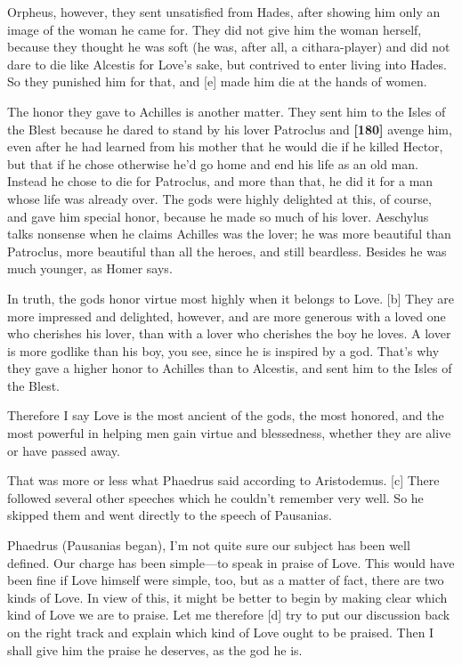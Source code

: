 Orpheus, however, they sent unsatisfied from Hades, after showing him
only an image of the woman he came for. They did not give him the woman
herself, because they thought he was soft (he was, after all, a
cithara-player) and did not dare to die like Alcestis for Love's sake,
but contrived to enter living into Hades. So they punished him for that,
and {[}e{]} made him die at the hands of
women.

The honor they gave to Achilles is another matter. They sent him to the
Isles of the Blest because he dared to stand by his lover Patroclus and
{\bf {[}180{]}} avenge him, even after he had learned from his mother
that he would die if he killed Hector, but that if he chose otherwise
he'd go home and end his life as an old man. Instead he chose to die for
Patroclus, and more than that, he did it for a man whose life was
already over. The gods were highly delighted at this, of course, and
gave him special honor, because he made so much of his lover. Aeschylus
talks nonsense when he claims Achilles was the
lover; he was more
beautiful than Patroclus, more beautiful than all the heroes, and still
beardless. Besides he was much younger, as Homer says.

In truth, the gods honor virtue most highly when it belongs to Love.
{[}b{]} They are more impressed and delighted, however, and are more
generous with a loved one who cherishes his lover, than with a lover who
cherishes the boy he loves. A lover is more godlike than his boy, you
see, since he is inspired by a god. That's why they gave a higher honor
to Achilles than to Alcestis, and sent him to the Isles of the Blest.

Therefore I say Love is the most ancient of the gods, the most honored,
and the most powerful in helping men gain virtue and blessedness,
whether they are alive or have passed away.

That was more or less what Phaedrus said according to Aristodemus.
{[}c{]} There followed several other speeches which he couldn't remember
very well. So he skipped them and went directly to the speech of
Pausanias.\crlf
\crlf

Phaedrus (Pausanias began), I'm not quite sure our subject has been well
defined. Our charge has been simple---to speak in praise of Love. This
would have been fine if Love himself were simple, too, but as a matter
of fact, there are two kinds of Love. In view of this, it might be
better to begin by making clear which kind of Love we are to praise. Let
me therefore {[}d{]} try to put our discussion back on the right track
and explain which kind of Love ought to be praised. Then I shall give
him the praise he deserves, as the god he is.

